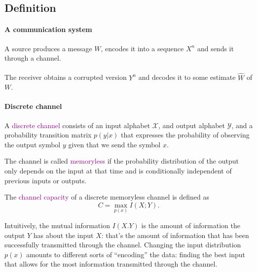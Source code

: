 \documentclass[a4paper, 11pt, openany]{book}
\numberwithin{equation}{section}
\theoremstyle{plain}
\theoremstyle{definition}
\newcommand{\Define}[1]{\textcolor{purple}{#1}}
\newcommand{\alphabet}[1]{\mathcal{#1}}
\begin{document}
\subsection{Definition}

\paragraph{A communication system}
A source produces a message $W$, encodes it into a sequence $X^n$ and sends it through a channel.\\
~\\
The receiver obtains a corrupted version $Y^n$ and decodes it to some estimate $\hat{W}$ of $W$.

\begin{center}
\end{center}





\paragraph{Discrete channel}


A \Define{discrete channel} consists of an input alphabet $\alphabet{X}$, and output alphabet $\alphabet{Y}$, and a probability transition matrix $p(y | x)$ that expresses the probability of observing the output symbol $y$ given that we send the symbol $x$.

The channel is called \Define{memoryless} if the probability distribution of the output only depends on the input at that time and is conditionally independent of previous inputs or outputs.

The \Define{channel capacity} of a discrete memoryless channel is defined as
\[
	C = \max_{p(x)} I(X;Y).
\]

Intuitively, the mutual information $I(X.Y)$ is the amount of information the output $Y$ has about the input $X$: that's the amount of information that has been successfully transmitted through the channel. Changing the input distribution $p(x)$ amounts to different sorts of ``encoding'' the data: finding the best input that allows for the most information transmitted through the channel.
\end{document}
